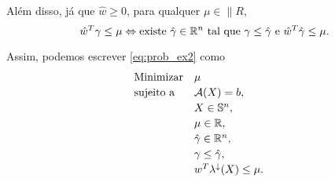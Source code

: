 \begin{homeworkProblemAnswer}
Além disso, já que $\hat{w} \geq 0$, para qualquer $\mu \in \|{R}$,
$$
    \hat{w}^T \gamma \leq \mu \Leftrightarrow 
    \text{existe } \hat{\gamma} \in \mathbb{R}^n \text{ tal que } \gamma \leq \hat{\gamma} \text{ e } \hat{w}^T\hat{\gamma} \leq \mu.
$$

Assim, podemos escrever \eqref{eq:prob_ex2} como 
\begin{equation*}
    \begin{array}[!h]{lll}
        \text{Minimizar} & \mu                                              & \\[2pt]
        \text{sujeito a} & \"{A}(X) = b,                                    & \\[2pt]
                         & X \in \|{S}^n,                                   & \\[2pt]
                         & \mu \in \|{R},                                   & \\[2pt]
                         & \hat{\gamma} \in \|{R}^n,                        & \\[2pt]
                         & \gamma \leq \hat{\gamma},                        & \\[2pt]
                         & w^T \eigen(X) \leq \mu.                          & \\
    \end{array}
\end{equation*}


\end{homeworkProblemAnswer}
